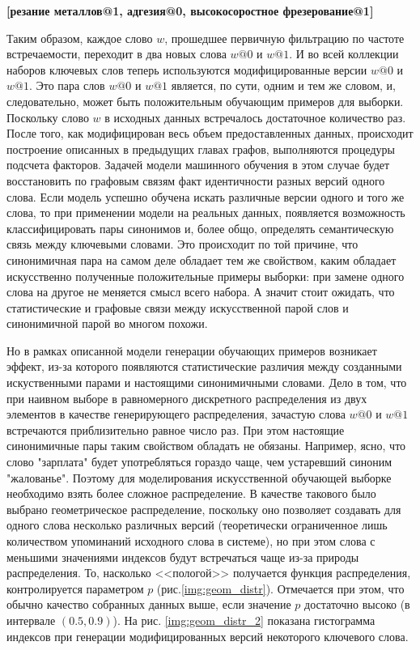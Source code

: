 \textbf{[резание металлов@1, адгезия@0, высокосоростное фрезерование@1]}\

Таким образом, каждое слово $w$, прошедшее первичную фильтрацию по частоте встречаемости, переходит в два новых слова $w@0$ и $w@1$. И во всей коллекции наборов ключевых слов теперь используются модифицированные версии $w@0$ и $w@1$. Это пара слов $w@0$ и $w@1$ является, по сути, одним и тем же словом, и, следовательно, может быть положительным обучающим примеров для выборки. Поскольку слово $w$ в исходных данных встречалось достаточное количество раз. После того, как модифицирован весь объем предоставленных данных, происходит построение описанных в предыдущих главах графов, выполняются процедуры подсчета факторов. Задачей модели машинного обучения в этом случае будет восстановить по графовым связям факт идентичности разных версий одного слова. Если модель успешно обучена искать различные версии одного и того же слова, то при применении модели на реальных данных, появляется возможность классифицировать пары синонимов и, более общо, определять семантическую связь между ключевыми словами.  Это происходит по той причине, что синонимичная пара на самом деле обладает тем же свойством, каким обладает искусственно полученные положительные примеры выборки: при замене одного слова на другое не меняется смысл всего набора. А значит стоит ожидать, что статистические и графовые связи между искусственной парой слов и синонимичной парой во многом похожи.

Но в рамках описанной модели генерации обучающих примеров возникает эффект, из-за которого появляются статистические различия между созданными искуственными парами и настоящими синонимичными словами. Дело в том, что при наивном выборе в равномерного дискретного распределения из двух элементов в качестве генерирующего распределения, зачастую слова $w@0$ и $w@1$ встречаются приблизительно равное число раз. При этом настоящие синонимичные пары таким свойством обладать не обязаны. Например, ясно, что слово "зарплата" будет употребляться гораздо чаще, чем устаревший синоним "жалованье". Поэтому для моделирования искусственной обучающей выборке необходимо взять более сложное распределение. В качестве такового было выбрано геометрическое распределение, поскольку оно позволяет создавать для одного слова несколько различных версий (теоретически ограниченное лишь количеством упоминаний исходного слова в системе), но при этом слова с меньшими значениями индексов будут встречаться чаще из-за природы распределения. То, насколько <<пологой>> получается функция распределения, контролируется параметром $p$ (рис.\ref{img:geom_distr}). Отмечается при этом, что обычно качество собранных данных выше, если значение $p$ достаточно высоко (в интервале $(0.5, 0.9)$). На рис. \ref{img:geom_distr_2} показана гистограмма индексов при генерации модифицированных версий некоторого ключевого слова.

